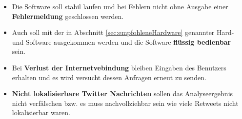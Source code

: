\begin{itemize}
	\item Die Software soll stabil laufen und bei Fehlern nicht ohne Ausgabe einer \textbf{Fehlermeldung} geschlossen werden.
	\item Auch soll mit der in Abschnitt \ref{sec:empfohleneHardware} genannter Hard- und Software ausgekommen werden und die Software \textbf{flüssig bedienbar} sein.
	\item Bei \textbf{Verlust der Internetvebindung} bleiben Eingaben des Benutzers erhalten und es wird versucht dessen Anfragen erneut zu senden.
	\item \textbf{Nicht lokalisierbare Twitter Nachrichten} sollen das Analyseergebnis nicht verfälschen bzw. es muss nachvollziehbar sein wie viele Retweets nicht lokalisierbar waren.
\end{itemize}
